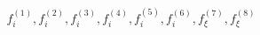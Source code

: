 \begin{equation} 
f^{{(1)}}_{i} , f^{{(2)}}_{i} , f^{{(3)}}_{i} , f^{{(4)}}_{i} , f^{{(5)}}_{i} , f^{{(6)}}_{i} , f^{{(7)}}_{{\xi}} , f^{{(8)}}_{{\xi}}
 \end{equation}
